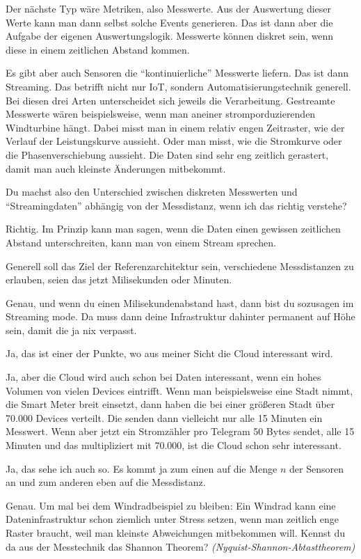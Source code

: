 Der nächste Typ wäre Metriken, also Messwerte. Aus der Auswertung dieser Werte kann man dann selbst solche Events generieren. Das ist dann aber die Aufgabe der eigenen Auswertungslogik. Messwerte können diskret sein, wenn diese in einem zeitlichen Abstand kommen. 

Es gibt aber auch Sensoren die \enquote{kontinuierliche} Messwerte liefern. Das ist dann Streaming.  Das betrifft nicht nur \ac{IoT}, sondern Automatisierungstechnik generell. Bei diesen drei Arten unterscheidet sich jeweils die Verarbeitung. Gestreamte Messwerte wären beispielsweise, wenn man aneiner stromporduzierenden Windturbine hängt. Dabei misst man in einem relativ engen Zeitraster, wie der Verlauf der Leistungskurve aussieht. Oder man misst, wie die Stromkurve oder die Phasenverschiebung aussieht. Die Daten sind sehr eng zeitlich gerastert, damit man auch kleinste Änderungen mitbekommt. 

\LF Du machst also den Unterschied zwischen diskreten Messwerten und \enquote{Streamingdaten} abhängig von der Messdistanz, wenn ich das richtig verstehe?

\PE Richtig. Im Prinzip kann man sagen, wenn die Daten einen gewissen zeitlichen Abstand unterschreiten, kann man von einem Stream sprechen. 

\LF Generell soll das Ziel der Referenzarchitektur sein, verschiedene Messdistanzen zu erlauben, seien das jetzt Milisekunden oder Minuten.

\PE Genau, und wenn du einen Milisekundenabstand hast, dann bist du sozusagen im Streaming mode. Da muss dann deine Infrastruktur dahinter permanent auf Höhe sein, damit die ja nix verpasst. 

\LF Ja, das ist einer der Punkte, wo aus meiner Sicht die Cloud interessant wird.

\PE Ja, aber die Cloud wird auch schon bei Daten interessant, wenn ein hohes Volumen von vielen Devices eintrifft. Wenn man beispielsweise eine Stadt nimmt, die Smart Meter breit einsetzt, dann haben die bei einer größeren Stadt über 70.000 Devices verteilt. Die senden dann vielleicht nur alle 15 Minuten ein Messwert. Wenn aber jetzt ein Stromzähler pro Telegram 50 Bytes sendet, alle 15 Minuten und das multipliziert mit 70.000, ist die Cloud schon sehr interessant.

\LF Ja, das sehe ich auch so. Es kommt ja zum einen auf die Menge $n$ der Sensoren an und zum anderen eben auf die Messdistanz.

\PE Genau. Um mal bei dem Windradbeispiel zu bleiben: Ein Windrad kann eine Dateninfrastruktur schon ziemlich unter Stress setzen, wenn man zeitlich enge Raster braucht, weil man kleinste Abweichungen mitbekommen will. Kennst du da aus der Messtechnik das Shannon Theorem? \textit{(Nyquist-Shannon-Abtasttheorem)}

